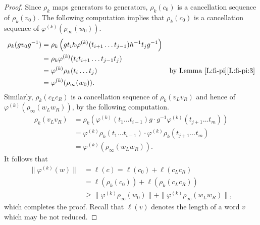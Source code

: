 \documentclass[12pt,reqno,a4paper]{article}
\theoremstyle{definition}
\theoremstyle{remark}
\numberwithin{equation}{section}
\numberwithin{figure}{section}
\begin{document}
\begin{proof}
Since $\rho_k$ maps generators to generators, $\rho_k(c_0)$ is a cancellation
sequence of $\rho_k(v_0)$. The following computation implies
that $\rho_k(c_0)$ is a cancellation sequence of $\varphi^{(k)}(\rho_{\infty}(w_0))$.
\begin{align*}
\rho_k(gv_0g^{-1}) 
&=\rho_k\left(gt_ih\varphi^{(k)}(t_{i+1}\dots t_{j-1})h^{-1}t_jg^{-1}\right)\\
&=\rho_k\varphi^{(k)}(t_it_{i+1}\dots t_{j-1}t_j)\\
&=\varphi^{(k)}\rho_k(t_i\dots t_j) &\text{by Lemma \ref{L:fi-pi}\ref{L:fi-pi:3}}\\
&=\varphi^{(k)}(\rho_{\infty}(w_0)).
\end{align*}
Similarly, $\rho_k(c_Lc_R)$ is a cancellation sequence of 
$\rho_k(v_Lv_R)$ and hence of $\varphi^{(k)}(\rho_{\infty}(w_Lw_R))$, 
by the following computation.
\begin{align*}
\rho_k(v_Lv_R)
&=\rho_k(\varphi^{(k)}(t_1\dots t_{i-1})g\cdot g^{-1}\varphi^{(k)}(t_{j+1}\dots t_m))\\
&=\varphi^{(k)}\rho_k(t_1\dots t_{i-1})\cdot \varphi^{(k)}\rho_k(t_{j+1}\dots t_m)\\
&=\varphi^{(k)}(\rho_{\infty}(w_Lw_R)).
\end{align*}
It follows that
\begin{align*}
\|\varphi^{(k)}(w)\|
&=\ell(c) 
=\ell(c_0) + \ell(c_Lc_R)\\
&=\ell(\rho_k(c_0)) + \ell(\rho_k(c_Lc_R))\\
&\geq \|\varphi^{(k)}\rho_{\infty}(w_0)\| + \|\varphi^{(k)}\rho_{\infty}(w_Lw_R)\|,
\end{align*}
which completes the proof.
Recall that $\ell(v)$ denotes the length of a word $v$ which may be not reduced.
\fi
\end{proof}
\end{document}
